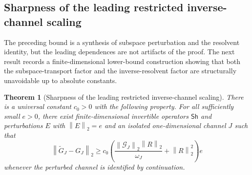 \documentclass[review]{siamart220329}
\newtheorem{theorem}{Theorem}[section]
\theoremstyle{definition}
\theoremstyle{remark}
\newcommand{\Sh}{\mathsf{Sh}}
\newcommand{\norm}[1]{\left\lVert #1\right\rVert}
\begin{document}
\subsection{Sharpness of the leading restricted inverse-channel scaling}\label{sec:near-sharpness}

The preceding bound is a synthesis of subspace perturbation and the resolvent
identity, but the leading dependences are not artifacts of the proof. The next
result records a finite-dimensional lower-bound construction showing that both
the subspace-transport factor and the inverse-resolvent factor are structurally
unavoidable up to absolute constants.

\begin{theorem}[Sharpness of the leading restricted inverse-channel scaling]
\label{thm:near-sharpness-main}
There is a universal constant $c_0>0$ with the following property. For all
sufficiently small $e>0$, there exist finite-dimensional invertible operators
$\Sh$ and perturbations $E$ with $\norm{E}_2=e$ and an isolated one-dimensional
channel $J$ such that
\begin{equation}
    \norm{\widetilde G_J-G_J}_2
    \ge
    c_0\left(
    \frac{\norm{\mathcal G_J}_2\norm{R}_2}{\omega_J}
    +
    \norm{R}_2^2
    \right)e
\end{equation}
whenever the perturbed channel is identified by continuation.
\end{theorem}
\end{document}
